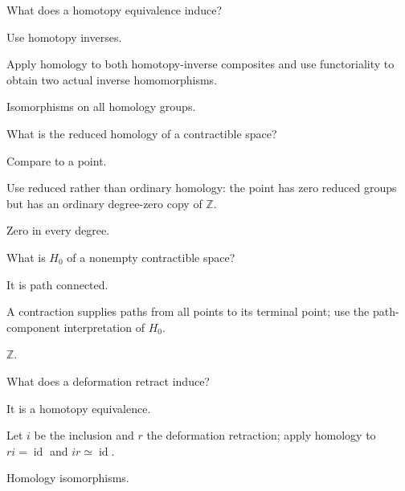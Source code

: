 \begin{exercise}\label{exr:viii20-08}
What does a homotopy equivalence induce?
\end{exercise}
\begin{hint}
Use homotopy inverses.

Apply homology to both homotopy-inverse composites and use functoriality to obtain two actual inverse homomorphisms.
\end{hint}
\begin{solution}
Isomorphisms on all homology groups.
\end{solution}

\begin{exercise}\label{exr:viii20-09}
What is the reduced homology of a contractible space?
\end{exercise}
\begin{hint}
Compare to a point.

Use reduced rather than ordinary homology: the point has zero reduced groups but has an ordinary degree-zero copy of \(\mathbb Z\).
\end{hint}
\begin{solution}
Zero in every degree.
\end{solution}

\begin{exercise}\label{exr:viii20-10}
What is \(H_0\) of a nonempty contractible space?
\end{exercise}
\begin{hint}
It is path connected.

A contraction supplies paths from all points to its terminal point; use the path-component interpretation of \(H_0\).
\end{hint}
\begin{solution}
\(\mathbb Z\).
\end{solution}

\begin{exercise}\label{exr:viii20-11}
What does a deformation retract induce?
\end{exercise}
\begin{hint}
It is a homotopy equivalence.

Let \(i\) be the inclusion and \(r\) the deformation retraction; apply homology to \(ri=\operatorname{id}\) and \(ir\simeq\operatorname{id}\).
\end{hint}
\begin{solution}
Homology isomorphisms.
\end{solution}

